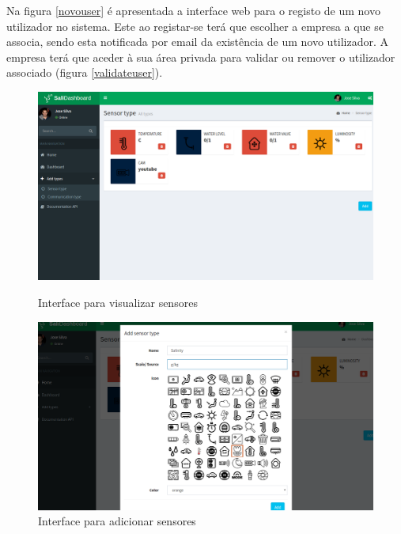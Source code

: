 Na figura \ref{novouser} é apresentada a interface web para o registo de um novo utilizador no sistema. Este ao registar-se terá que escolher a empresa a que se associa, sendo esta notificada por email da existência de um novo utilizador. A empresa terá que aceder à sua área privada para validar ou remover o utilizador associado (figura \ref{validateuser}).



\begin{figure}[h]
	\centering
	\begin{minipage}[b]{0.49\textwidth}
		\centering
		\includegraphics[width=\textwidth]{prints-web/sensor_show.png}
		\caption{Interface para visualizar sensores}
		\label{view-sensorall}
	\end{minipage}
	\hfill
	\begin{minipage}[b]{0.49\textwidth}
		\centering
		\includegraphics[width=\textwidth]{prints-web/sensor_add.png}
		\caption{ Interface para adicionar sensores}
		\label{add-sensorall}
	\end{minipage}
\end{figure}


